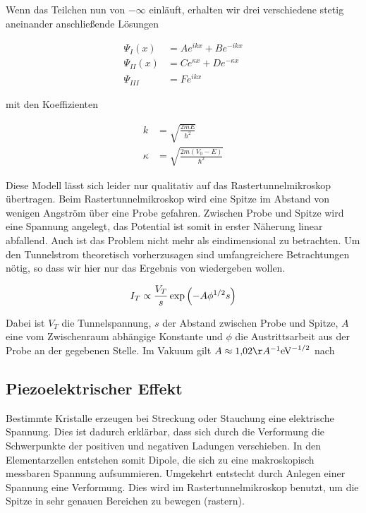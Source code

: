 \documentclass[a4paper,german,12pt,smallheadings]{scrartcl}
\begin{document}
Wenn das Teilchen nun von $-\infty$ einläuft, erhalten wir drei verschiedene
stetig aneinander anschließende Lösungen

\begin{align*}
  \Psi_{I}(x) &= A e^{ikx} + B e^{-ikx} \\
  \Psi_{II}(x) &= C e^{\kappa x} + D e^{-\kappa x} \\
  \Psi_{III} &= F e^{ikx}
\end{align*}

mit den Koeffizienten

\begin{align*}
  k &= \sqrt{\frac{2mE}{\hbar^2}} \\
  \kappa &= \sqrt{\frac{2m (V_0 - E)}{\hbar^2}}
\end{align*}

Diese Modell lässt sich leider nur qualitativ auf das Rastertunnelmikroskop
übertragen. Beim Rastertunnelmikroskop wird eine Spitze im Abstand von wenigen
Angström über eine Probe gefahren. Zwischen Probe und Spitze wird eine Spannung
angelegt, das Potential ist somit in erster Näherung linear abfallend. Auch ist
das Problem nicht mehr als eindimensional zu betrachten. Um den Tunnelstrom
theoretisch vorherzusagen sind umfangreichere Betrachtungen nötig, so dass wir
hier nur das Ergebnis von \citep{hpa1982} wiedergeben wollen.

\begin{equation}
  I_{T} \propto \frac{V_T}{s} \exp \del{-A \phi^{1/2} s}
\end{equation}

Dabei ist $V_T$ die Tunnelspannung, $s$ der Abstand zwischen Probe und Spitze,
$A$ eine vom Zwischenraum abhängige Konstante und $\phi$ die Austrittsarbeit
aus der Probe an der gegebenen Stelle. Im Vakuum gilt
$A \approx 1{,}02 \AA^{-1} \text{eV}^{-1/2}$ nach \citep{versuchsanleitung}

\subsection{Piezoelektrischer Effekt}

Bestimmte Kristalle erzeugen bei Streckung oder Stauchung eine elektrische
Spannung. Dies ist dadurch erklärbar, dass sich durch die Verformung die
Schwerpunkte der positiven und negativen Ladungen verschieben. In den
Elementarzellen entstehen somit Dipole, die sich zu eine makroskopisch
messbaren Spannung aufsummieren. Umgekehrt entstecht durch Anlegen einer
Spannung eine Verformung. Dies wird im Rastertunnelmikroskop benutzt, um die
Spitze in sehr genauen Bereichen zu bewegen (rastern)\citep{versuchsanleitung}.
\end{document}
